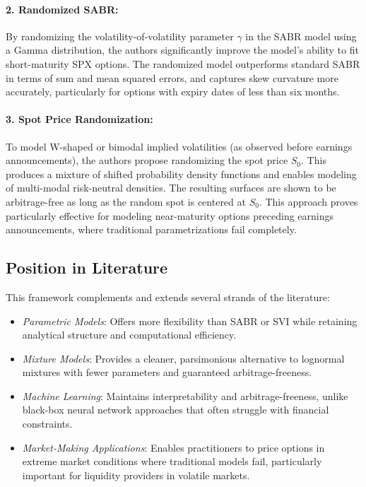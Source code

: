 \paragraph{2. Randomized SABR:}
By randomizing the volatility-of-volatility parameter $\gamma$ in the SABR model using a Gamma distribution, the authors significantly improve the model's ability to fit short-maturity SPX options. The randomized model outperforms standard SABR in terms of sum and mean squared errors, and captures skew curvature more accurately, particularly for options with expiry dates of less than six months.

\paragraph{3. Spot Price Randomization:}
To model W-shaped or bimodal implied volatilities (as observed before earnings announcements), the authors propose randomizing the spot price $S_0$. This produces a mixture of shifted probability density functions and enables modeling of multi-modal risk-neutral densities. The resulting surfaces are shown to be arbitrage-free as long as the random spot is centered at $S_0$. This approach proves particularly effective for modeling near-maturity options preceding earnings announcements, where traditional parametrizations fail completely.

\subsection{Position in Literature}

This framework complements and extends several strands of the literature:

\begin{itemize}
    \item \textit{Parametric Models}: Offers more flexibility than SABR or SVI while retaining analytical structure and computational efficiency.
    \item \textit{Mixture Models}: Provides a cleaner, parsimonious alternative to lognormal mixtures with fewer parameters and guaranteed arbitrage-freeness.
    \item \textit{Machine Learning}: Maintains interpretability and arbitrage-freeness, unlike black-box neural network approaches that often struggle with financial constraints.
    \item \textit{Market-Making Applications}: Enables practitioners to price options in extreme market conditions where traditional models fail, particularly important for liquidity providers in volatile markets.
\end{itemize}

